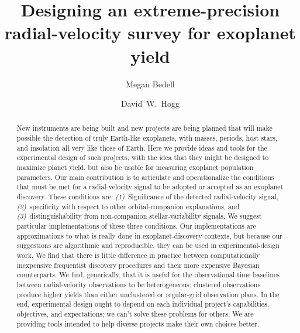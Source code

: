 \documentclass[modern]{aastex63}
\begin{document}
\title{Designing an extreme-precision radial-velocity survey for exoplanet yield}

\author[0000-0001-9907-7742]{Megan Bedell}

\author[0000-0003-2866-9403]{David~W.~Hogg}

\begin{abstract}\noindent
New instruments are being built and new projects are being planned
that will make possible the detection of truly Earth-like exoplanets,
with masses, periods, host stars, and insolation all very like those of
Earth.
Here we provide ideas and tools for the experimental design of such
projects, with the idea that they might be designed to maximize planet
yield, but also be usable for measuring exoplanet population
parameters.
Our main contribution is to articulate and operationalize the
conditions that must be met for a radial-velocity signal to be adopted
or accepted as an exoplanet discovery.
These conditions are:
\textsl{(1)}~Significance of the detected radial-velocity signal,
\textsl{(2)}~specificity with respect to other orbital-companion explanations, and
\textsl{(3)}~distinguishability from non-companion stellar-variability signals.
We suggest particular implementations of these three conditions.
Our implementations are approximations to what is really done in
exoplanet-discovery contexts, but because our suggestions are
algorithmic and reproducible, they can be used in experimental-design
work.
We find that there is little difference in practice between
computationally inexpensive frequentist discovery procedures and their
more expensive Bayesian counterparts.
We find, generically, that it is useful for the observational time
baselines between radial-velocity observations to be heterogeneous;
clustered observations produce higher yields than either unclustered
or regular-grid observation plans.
In the end, experimental design ought to depend on each individual
project's capabilities, objectives, and expectations; we can't solve
these problems for others. We are providing tools intended to help
diverse projects make their own choices better.
\end{abstract}
\end{document}
